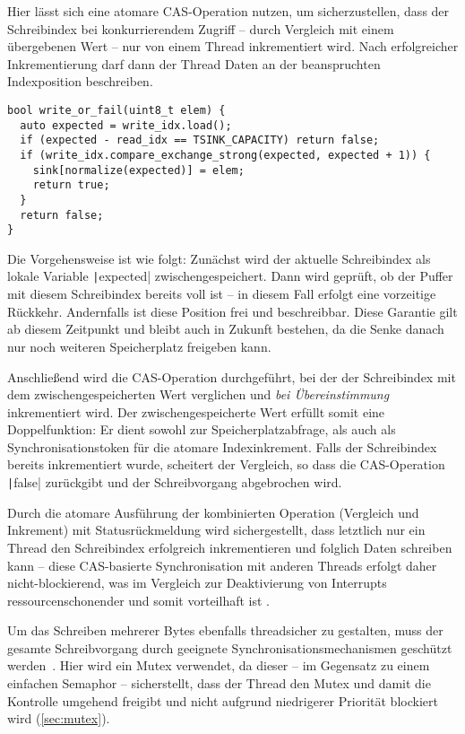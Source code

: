 Hier lässt sich eine atomare \ac{CAS}-Operation nutzen, um sicherzustellen, dass
der Schreibindex bei konkurrierendem Zugriff -- durch Vergleich mit einem
übergebenen Wert -- nur von einem Thread inkrementiert wird. Nach erfolgreicher
Inkrementierung darf dann der Thread Daten an der beanspruchten Indexposition
beschreiben.

\begin{code}
\begin{verbatim}
bool write_or_fail(uint8_t elem) {
  auto expected = write_idx.load();
  if (expected - read_idx == TSINK_CAPACITY) return false;
  if (write_idx.compare_exchange_strong(expected, expected + 1)) {
    sink[normalize(expected)] = elem;
    return true;
  }
  return false;
}
\end{verbatim}
\end{code}

Die Vorgehensweise ist wie folgt: Zunächst wird der aktuelle Schreibindex als
lokale Variable \texttt|expected| zwischengespeichert. Dann wird
geprüft, ob der Puffer mit diesem Schreibindex bereits voll ist -- in diesem
Fall erfolgt eine vorzeitige Rückkehr. Andernfalls ist diese Position frei und
beschreibbar. Diese Garantie gilt ab diesem Zeitpunkt und bleibt auch in Zukunft
bestehen, da die Senke danach nur noch weiteren Speicherplatz freigeben kann.

Anschließend wird die CAS-Operation durchgeführt, bei der der Schreibindex mit
dem zwischengespeicherten Wert verglichen und \textit{bei Übereinstimmung}
inkrementiert wird. Der zwischengespeicherte Wert erfüllt somit eine
Doppelfunktion: Er dient sowohl zur Speicherplatzabfrage, als auch als
Synchronisationstoken für die atomare Indexinkrement. Falls der Schreibindex
bereits inkrementiert wurde, scheitert der Vergleich, so dass die CAS-Operation
\texttt|false| zurückgibt und der Schreibvorgang abgebrochen wird.

Durch die atomare Ausführung der kombinierten Operation (Vergleich und
Inkrement) mit Statusrückmeldung wird sichergestellt, dass letztlich nur ein
Thread den Schreibindex erfolgreich inkrementieren und folglich Daten schreiben
kann -- diese CAS-basierte Synchronisation mit anderen Threads erfolgt daher
nicht-blockierend, was im Vergleich zur Deaktivierung von Interrupts
ressourcenschonender und somit vorteilhaft ist \cite{wikipedia_cas}.

Um das Schreiben mehrerer Bytes ebenfalls threadsicher zu gestalten, muss der
gesamte Schreibvorgang durch geeignete Synchronisationsmechanismen geschützt
werden~\cite{FreeRTOSForumPrintf}. Hier wird ein Mutex verwendet, da dieser --
im Gegensatz zu einem einfachen Semaphor -- sicherstellt, dass der Thread den
Mutex und damit die Kontrolle umgehend freigibt und nicht aufgrund niedrigerer
Priorität blockiert wird (\ref{sec:mutex}).

